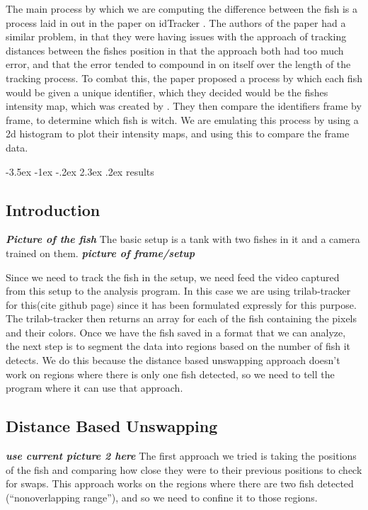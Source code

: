\documentclass{article}
\makeatletter
\renewcommand\section{\clearpage\newpage\@startsection {section}{1}{\z@}%
	{-3.5ex \@plus -1ex \@minus -.2ex}%
	{2.3ex \@plus.2ex}%
	{\normalfont\Large\bfseries}}
\makeatother
\begin{document}
The main process by which we are computing the difference between the fish is a process laid in out in the paper on idTracker \cite{idTracker}. The authors of the paper had a similar problem, in that they were having issues with the approach of tracking distances between the fishes position in that the approach both had too much error, and that the error tended to compound in on itself over the length of the tracking process. To combat this, the paper proposed a process by which each fish would be given a unique identifier, which they decided would be the fishes intensity map, which was created by . They then compare the identifiers frame by frame, to determine which fish is witch. We are emulating this process by using a 2d histogram to plot their intensity maps, and using this to compare the frame data.

\section{results}



\subsection{Introduction}
\textbf{\textit{Picture of the fish}}
The basic setup is a tank with two fishes in it and a camera trained on them. 
\textbf{\textit{picture of frame/setup}}

Since we need to track the fish in the setup, we need feed the video captured from this setup to the analysis program. In this case we are using trilab-tracker for this(cite github page) since it has been formulated expressly for this purpose. The trilab-tracker then returns an array for each of the fish containing the pixels and their colors. Once we have the fish saved in a format that we can analyze, the next step is to segment the data into regions based on the number of fish it detects. We do this because the distance based unswapping approach doesn't work on regions where there is only one fish detected, so we need to tell the program where it can use that approach.

\subsection{Distance Based Unswapping}
\textbf{\textit{use current picture 2 here}}
The first approach we tried is taking the positions of the fish and comparing how close they were to their previous positions to check for swaps. This approach works on the regions where there are two fish detected (``nonoverlapping range''), and so we need to confine it to those regions. 
\end{document}
